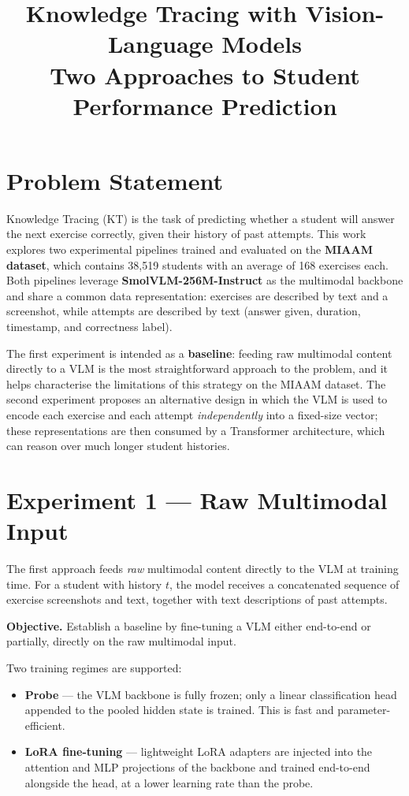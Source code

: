 \documentclass[10pt]{article}
\title{\textbf{Knowledge Tracing with Vision-Language Models}\\
\large Two Approaches to Student Performance Prediction}
\begin{document}
\maketitle
\thispagestyle{empty}

\section*{Problem Statement}

Knowledge Tracing (KT) is the task of predicting whether a student will answer the next exercise
correctly, given their history of past attempts. This work explores two experimental pipelines
trained and evaluated on the \textbf{MIAAM dataset}, which contains 38,519 students with an
average of 168 exercises each. Both pipelines leverage \textbf{SmolVLM-256M-Instruct} as the
multimodal backbone and share a common data representation: exercises are described by text
and a screenshot, while attempts are described by text (answer given, duration, timestamp,
and correctness label).

The first experiment is intended as a \textbf{baseline}: feeding raw multimodal content directly
to a VLM is the most straightforward approach to the problem, and it helps characterise the
limitations of this strategy on the MIAAM dataset. The second experiment proposes an alternative
design in which the VLM is used to encode each exercise and each attempt \emph{independently}
into a fixed-size vector; these representations are then consumed by a Transformer architecture,
which can reason over much longer student histories.

\section*{Experiment 1 --- Raw Multimodal Input}

The first approach feeds \emph{raw} multimodal content directly to the VLM at training time. 
For a student with history $t$, the model receives a concatenated sequence of exercise 
screenshots and text, together with text descriptions of past attempts.

\textbf{Objective.} Establish a baseline by fine-tuning a VLM either end-to-end or 
partially, directly on the raw multimodal input.

Two training regimes are supported:
\begin{itemize}
  \item \textbf{Probe} — the VLM backbone is fully frozen; only a linear classification head appended
   to the pooled hidden state is trained. This is fast and parameter-efficient.
  \item \textbf{LoRA fine-tuning} — lightweight LoRA adapters are injected into the attention 
  and MLP projections of the backbone and trained end-to-end alongside the head, at a lower 
  learning rate than the probe.
\end{itemize}
\end{document}
